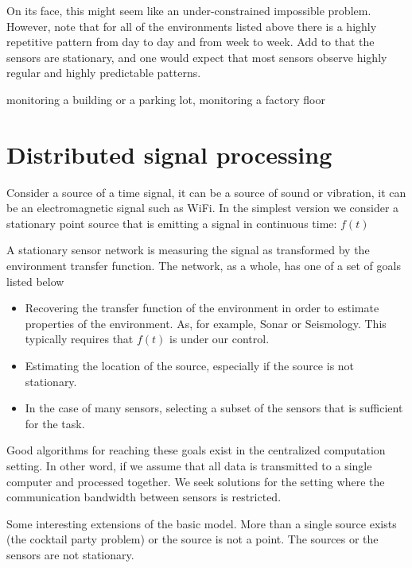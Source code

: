 \documentclass{article}
\begin{document}
 On its face, this might seem like an under-constrained impossible problem. However, note that for all of the environments listed above there is a highly repetitive pattern from day to day and from week to week. Add to that the sensors are stationary, and one would expect that most sensors observe highly regular and highly predictable patterns.
 
 
 
 monitoring a building or a parking lot, monitoring a factory floor

\section{Distributed signal processing}

Consider a source of a time signal, it can be a source of sound or vibration, it can be an electromagnetic signal such as WiFi. In the simplest version we consider a stationary point source that is emitting a signal in continuous time: $f(t)$

A stationary sensor network is measuring the signal as transformed by the environment transfer function. The network, as a whole, has one of a set of goals listed below

\begin{itemize}
    \item Recovering the transfer function of the environment in order to estimate properties of the environment. As, for example, Sonar or Seismology. This typically requires that $f(t)$ is under our control.
    \item Estimating the location of the source, especially if the source is not stationary.
    \item In the case of many sensors, selecting a subset of the sensors that is sufficient for the task.
\end{itemize}

Good algorithms for reaching these goals exist in the centralized computation setting. In other word, if we assume that all data is  transmitted to a single computer and processed together. We seek solutions for the setting where the communication bandwidth between sensors is restricted.

Some interesting extensions of the basic model. More than a single source exists (the cocktail party problem) or the source is not a point. The sources or the sensors are not stationary. 
\end{document}
